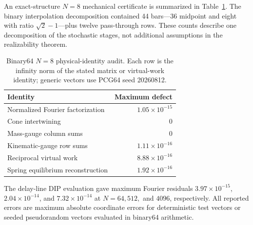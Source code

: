 An exact-structure $N=8$ mechanical certificate is summarized in
Table~\ref{tab:mechanical-audit}.  The binary interpolation decomposition contained
44 bars---36 midpoint and eight with ratio $\sqrt2-1$---plus twelve
pass-through rows.  These counts describe one decomposition of the stochastic
stages, not additional assumptions in the realizability theorem.

\begin{table}[t]
\caption{Binary64 $N=8$ physical-identity audit.  Each row is the infinity
norm of the stated matrix or virtual-work identity; generic vectors use PCG64
seed 20260812.}
\label{tab:mechanical-audit}
\centering
\begin{tabular}{@{}lr@{}}
\toprule
Identity & Maximum defect\\
\midrule
Normalized Fourier factorization & $1.05\times10^{-15}$\\
Cone intertwining & $0$\\
Mass-gauge column sums & $0$\\
Kinematic-gauge row sums & $1.11\times10^{-16}$\\
Reciprocal virtual work & $8.88\times10^{-16}$\\
Spring equilibrium reconstruction & $1.92\times10^{-16}$\\
\bottomrule
\end{tabular}
\end{table}

The delay-line DIP evaluation gave maximum Fourier residuals
$3.97\times10^{-15}$, $2.04\times10^{-14}$, and $7.32\times10^{-14}$ at
$N=64,512,$ and $4096$, respectively.  All reported errors are maximum absolute
coordinate errors for deterministic test vectors or seeded pseudorandom
vectors evaluated in binary64 arithmetic.
